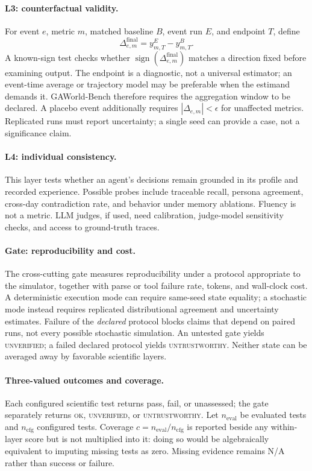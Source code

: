 \documentclass[letterpaper]{article}
\begin{document}
\paragraph{L3: counterfactual validity.}
For event $e$, metric $m$, matched baseline $B$, event run $E$, and endpoint $T$, define
\begin{equation}
\Delta^{\mathrm{final}}_{e,m}=y^{E}_{m,T}-y^{B}_{m,T}.
\end{equation}
A known-sign test checks whether $\operatorname{sign}(\Delta^{\mathrm{final}}_{e,m})$ matches a direction
fixed before examining output. The endpoint is a diagnostic, not a universal estimator; an event-time
average or trajectory model may be preferable when the estimand demands it. GAWorld-Bench therefore
requires the aggregation window to be declared. A placebo event additionally requires
$|\Delta_{e,m}|<\epsilon$ for unaffected metrics. Replicated runs must report uncertainty; a single seed
can provide a case, not a significance claim.

\paragraph{L4: individual consistency.}
This layer tests whether an agent's decisions remain grounded in its profile and recorded experience.
Possible probes include traceable recall, persona agreement, cross-day contradiction rate, and behavior
under memory ablations. Fluency is not a metric. LLM judges, if used, need calibration, judge-model
sensitivity checks, and access to ground-truth traces.

\paragraph{Gate: reproducibility and cost.}
The cross-cutting gate measures reproducibility under a protocol appropriate to the simulator, together
with parse or tool failure rate, tokens, and wall-clock cost. A deterministic execution mode can require
same-seed state equality; a stochastic mode instead requires replicated distributional agreement and
uncertainty estimates. Failure of the \emph{declared} protocol blocks claims that depend on paired runs,
not every possible stochastic simulation. An untested gate yields \textsc{unverified}; a failed declared
protocol yields \textsc{untrustworthy}. Neither state can be averaged away by favorable scientific layers.

\paragraph{Three-valued outcomes and coverage.}
Each configured scientific test returns pass, fail, or unassessed; the gate separately returns
\textsc{ok}, \textsc{unverified}, or \textsc{untrustworthy}. Let $n_{\mathrm{eval}}$ be evaluated tests and
$n_{\mathrm{cfg}}$ configured tests. Coverage $c=n_{\mathrm{eval}}/n_{\mathrm{cfg}}$ is reported beside any
within-layer score but is not multiplied into it: doing so would be algebraically equivalent to imputing
missing tests as zero. Missing evidence remains N/A rather than success or failure.
\end{document}
